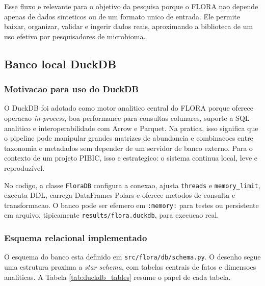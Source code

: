 \documentclass[12pt,a4paper]{article}
\begin{document}
Esse fluxo e relevante para o objetivo da pesquisa porque o FLORA nao depende apenas de dados sinteticos ou de um formato unico de entrada. Ele permite baixar, organizar, validar e ingerir dados reais, aproximando a biblioteca de um uso efetivo por pesquisadores de microbioma.

\subsection{Banco local DuckDB}

\subsubsection{Motivacao para uso do DuckDB}

O DuckDB \cite{raasveldt2019} foi adotado como motor analitico central do FLORA porque oferece operacao \textit{in-process}, boa performance para consultas colunares, suporte a SQL analitico e interoperabilidade com Arrow e Parquet. Na pratica, isso significa que o pipeline pode manipular grandes matrizes de abundancia e combinacoes entre taxonomia e metadados sem depender de um servidor de banco externo. Para o contexto de um projeto PIBIC, isso e estrategico: o sistema continua local, leve e reproduzivel.

No codigo, a classe \texttt{FloraDB} configura a conexao, ajusta \texttt{threads} e \texttt{memory\_limit}, executa DDL, carrega DataFrames Polars e oferece metodos de consulta e transformacao. O banco pode ser efemero em \texttt{:memory:} para testes ou persistente em arquivo, tipicamente \texttt{results/flora.duckdb}, para execucao real.

\subsubsection{Esquema relacional implementado}

O esquema do banco esta definido em \texttt{src/flora/db/schema.py}. O desenho segue uma estrutura proxima a \textit{star schema}, com tabelas centrais de fatos e dimensoes analiticas. A Tabela \ref{tab:duckdb_tables} resume o papel de cada tabela.
\end{document}
